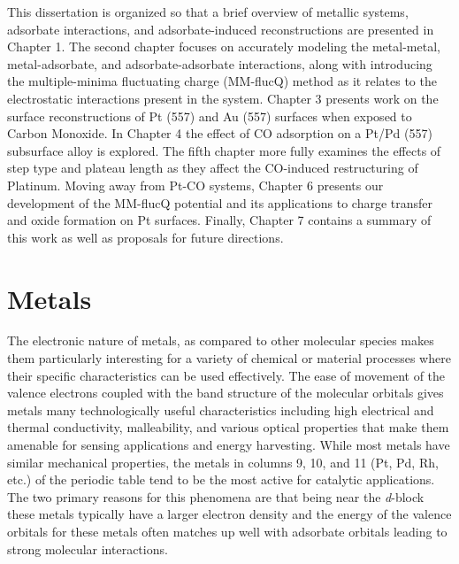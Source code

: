 


This dissertation is organized so that a brief overview of metallic systems,
adsorbate interactions, and adsorbate-induced reconstructions are presented in
Chapter 1. The second chapter focuses on accurately modeling the metal-metal,
metal-adsorbate, and adsorbate-adsorbate interactions, along with introducing
the multiple-minima fluctuating charge (MM-flucQ) method as it relates to the
electrostatic interactions present in the system. Chapter 3 presents work
on the surface reconstructions of Pt (557) and Au (557) surfaces when exposed
to Carbon Monoxide. In Chapter 4 the effect of CO adsorption on a Pt/Pd (557)
subsurface alloy is explored. The fifth chapter more fully examines the effects
of step type and plateau length as they affect the CO-induced restructuring of
Platinum. Moving away from Pt-CO systems, Chapter 6 presents our development of
the MM-flucQ potential and its applications to charge transfer and oxide
formation on Pt surfaces. Finally, Chapter 7 contains a summary of this
work as well as proposals for future directions.

\section{Metals}
The electronic nature of metals, as compared to other molecular species makes
them particularly interesting for a variety of chemical or material processes
where their specific characteristics can be used effectively. The ease of
movement of the valence electrons coupled with the band structure of the
molecular orbitals gives metals many technologically useful characteristics
including high electrical and thermal conductivity, malleability, and various
optical properties that make them amenable for sensing applications and energy
harvesting. While most metals have similar mechanical properties, the metals in
columns 9, 10, and 11 (Pt, Pd, Rh, etc.) of the periodic table tend to be the
most active for catalytic applications. The two primary reasons for this
phenomena are that being near the {\it d}-block these metals typically have a
larger electron density and the energy of the valence orbitals for these metals
often matches up well with adsorbate orbitals leading to strong molecular
interactions.


